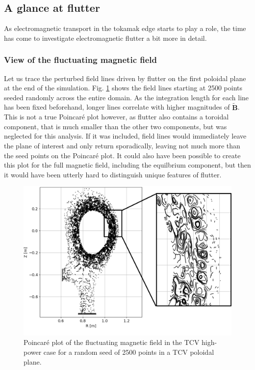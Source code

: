 \subsection{A glance at flutter}

As electromagnetic transport in the tokamak edge starts to play a role, the time has come to investigate electromagnetic flutter a bit more in detail. 

\subsubsection{View of the fluctuating magnetic field}


Let us trace the perturbed field lines driven by flutter on the first poloidal plane at the end of the simulation. Fig. \ref{fig:TCV_poincareFlutter} shows the field lines starting at 2500 points seeded randomly across the entire domain. As the integration length for each line has been fixed beforehand, longer lines correlate with higher magnitudes of $\mathbf{\tilde{B}}$. This is not a true Poincaré plot however, as flutter also contains a toroidal component, that is much smaller than the other two components, but was neglected for this analysis. If it was included, field lines would immediately leave the plane of interest and only return sporadically, leaving not much more than the seed points on the Poincaré plot. It could also have been possible to create this plot for the full magnetic field, including the equilbrium component, but then it would have been utterly hard to distinguish unique features of flutter. \newline 

\begin{figure}[H]\centering
	\centering
	\includegraphics[width=1\textwidth]{schemes/poincareFlutterHighPower.png}
	\caption{Poincaré plot of the fluctuating magnetic field in the TCV high-power case for a random seed of 2500 points in a TCV poloidal plane.}
	\label{fig:TCV_poincareFlutter}
\end{figure}

